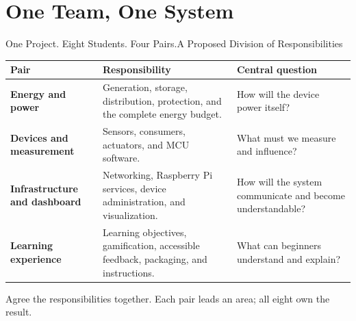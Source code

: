 \section[nosectionpage]{One Team, One System}
\begin{frame}{One Project. Eight Students. Four Pairs.}{A Proposed Division of Responsibilities}
\small\renewcommand{\arraystretch}{1.35}
\par\noindent\begin{tabularx}{\textwidth}{@{}>{\raggedright\arraybackslash}p{}>{\raggedright\arraybackslash}X >{\raggedright\arraybackslash}p{}@{}}
\toprule
\textbf{Pair} & \textbf{Responsibility} & \textbf{Central question}\\\midrule
\textbf{Energy and power} & Generation, storage, distribution, protection, and the complete energy budget. & How will the device power itself?\\
\textbf{Devices and measurement} & Sensors, consumers, actuators, and MCU software. & What must we measure and influence?\\
\textbf{Infrastructure and dashboard} & Networking, Raspberry Pi services, device administration, and visualization. & How will the system communicate and become understandable?\\
\textbf{Learning experience} & Learning objectives, gamification, accessible feedback, packaging, and instructions. & What can beginners understand and explain?\\\bottomrule
\end{tabularx}\par
\vspace{.6em}
\alert{Agree the responsibilities together. Each pair leads an area; all eight own the result.}
\end{frame}

